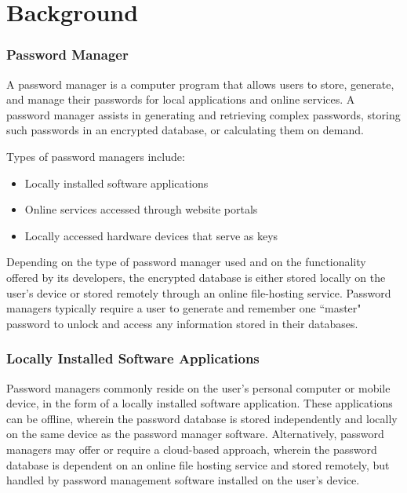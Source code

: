 \chapter{Background}
\label{sec:background}

\subsection{Password Manager}

A password manager is a computer program that allows users to store, generate, and manage their passwords for local applications and online services.
A password manager assists in generating and retrieving complex passwords, storing such passwords in an encrypted database, or calculating them on demand.

Types of password managers include:

\begin{itemize}
    \item Locally installed software applications
    \item Online services accessed through website portals
    \item Locally accessed hardware devices that serve as keys
\end{itemize}

Depending on the type of password manager used and on the functionality offered by its developers, the encrypted database is either stored locally on the user's device or stored remotely through an online file-hosting service. Password managers typically require a user to generate and remember one ``master" password to unlock and access any information stored in their databases.

\subsection{Locally Installed Software Applications}

Password managers commonly reside on the user's personal computer or mobile device, in the form of a locally installed software application. These applications can be offline, wherein the password database is stored independently and locally on the same device as the password manager software. Alternatively, password managers may offer or require a cloud-based approach, wherein the password database is dependent on an online file hosting service and stored remotely, but handled by password management software installed on the user's device.

